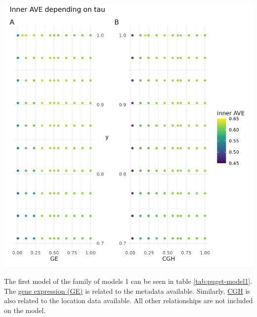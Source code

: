 \documentclass[
  12pt,
  a4paper,
  twoside,
  openright]{book}
\let\origfigure\figure
\let\endorigfigure\endfigure
\renewenvironment{figure}[1][2] {
    \expandafter\origfigure\expandafter[!htbp]
} {
    \endorigfigure
}
\begin{document}
\begin{figure}
\includegraphics[width=1\linewidth]{images/pugets_tau_to_AVE} \caption[Effect of tau on the inner AVE on Puget's dataset.]{Effect of tau on the inner AVE on Puget's dataset. The suggested tau value is the column between the regular grid, on the ordinate axis the y's tau values and on the abscissa the gene expression (GE) on the left and the comparative genomic hybridization (CGH) on the right. The highest inner AVE is with high tau values for y and middle to upper values for GE and CGH.}\label{fig:puget-tau2AVE}
\end{figure}

The first model of the family of models 1 can be seen in table \ref{tab:puget-model1}.
The \protect\hyperlink{acronyms_GE}{gene expression (GE)} is related to the metadata available.
Similarly, \protect\hyperlink{acronyms_CGH}{CGH} is also related to the location data available.
All other relationships are not included on the model.
\end{document}
